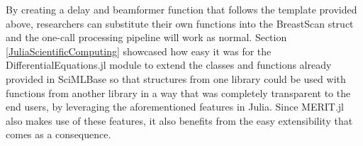 By creating a delay and beamformer function that follows the template provided above, researchers can substitute their
own functions into the BreastScan struct and the one-call processing pipeline will work as normal. Section
\ref{JuliaScientificComputing} showcased how easy it was for the DifferentialEquations.jl module to extend the classes
and functions already provided in SciMLBase so that structures from one library could be used with functions from another
library in a way that was completely transparent to the end users, by leveraging the aforementioned features in Julia.
Since MERIT.jl also makes use of these features, it also benefits from the easy extensibility that comes as a
consequence.

